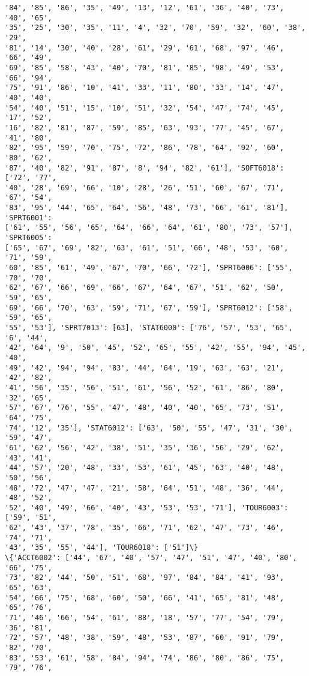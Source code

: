 \documentclass[11pt]{article}
\begin{document}
\begin{Verbatim}[commandchars=\\\{\}]
'84', '85', '86', '35', '49', '13', '12', '61', '36', '40', '73', '40', '65',
'35', '25', '30', '35', '11', '4', '32', '70', '59', '32', '60', '38', '29',
'81', '14', '30', '40', '28', '61', '29', '61', '68', '97', '46', '66', '49',
'69', '85', '58', '43', '40', '70', '81', '85', '98', '49', '53', '66', '94',
'75', '91', '86', '10', '41', '33', '11', '80', '33', '14', '47', '40', '40',
'54', '40', '51', '15', '10', '51', '32', '54', '47', '74', '45', '17', '52',
'16', '82', '81', '87', '59', '85', '63', '93', '77', '45', '67', '41', '80',
'82', '95', '59', '70', '75', '72', '86', '78', '64', '92', '60', '80', '62',
'87', '40', '82', '91', '87', '8', '94', '82', '61'], 'SOFT6018': ['72', '77',
'40', '28', '69', '66', '10', '28', '26', '51', '60', '67', '71', '67', '54',
'83', '95', '44', '65', '64', '56', '48', '73', '66', '61', '81'], 'SPRT6001':
['61', '55', '56', '65', '64', '66', '64', '61', '80', '73', '57'], 'SPRT6005':
['65', '67', '69', '82', '63', '61', '51', '66', '48', '53', '60', '71', '59',
'60', '85', '61', '49', '67', '70', '66', '72'], 'SPRT6006': ['55', '70', '70',
'62', '67', '66', '69', '66', '67', '64', '67', '51', '62', '50', '59', '65',
'69', '66', '70', '63', '59', '71', '67', '59'], 'SPRT6012': ['58', '59', '65',
'55', '53'], 'SPRT7013': [63], 'STAT6000': ['76', '57', '53', '65', '6', '44',
'42', '64', '9', '50', '45', '52', '65', '55', '42', '55', '94', '45', '40',
'49', '42', '94', '94', '83', '44', '64', '19', '63', '63', '21', '42', '82',
'41', '56', '35', '56', '51', '61', '56', '52', '61', '86', '80', '32', '65',
'57', '67', '76', '55', '47', '48', '40', '40', '65', '73', '51', '64', '75',
'74', '12', '35'], 'STAT6012': ['63', '50', '55', '47', '31', '30', '59', '47',
'61', '62', '56', '42', '38', '51', '35', '36', '56', '29', '62', '43', '41',
'44', '57', '20', '48', '33', '53', '61', '45', '63', '40', '48', '50', '56',
'48', '72', '47', '47', '21', '58', '64', '51', '48', '36', '44', '48', '52',
'52', '40', '49', '66', '40', '43', '53', '53', '71'], 'TOUR6003': ['59', '51',
'62', '43', '37', '78', '35', '66', '71', '62', '47', '73', '46', '74', '71',
'43', '35', '55', '44'], 'TOUR6018': ['51']\}
\{'ACCT6002': ['44', '67', '40', '57', '47', '51', '47', '40', '80', '66', '75',
'73', '82', '44', '50', '51', '68', '97', '84', '84', '41', '93', '65', '63',
'54', '66', '75', '68', '60', '50', '66', '41', '65', '81', '48', '65', '76',
'71', '46', '66', '54', '61', '88', '18', '57', '77', '54', '79', '36', '81',
'72', '57', '48', '38', '59', '48', '53', '87', '60', '91', '79', '82', '70',
'83', '53', '61', '58', '84', '94', '74', '86', '80', '86', '75', '79', '76',

\end{Verbatim}
\end{document}
